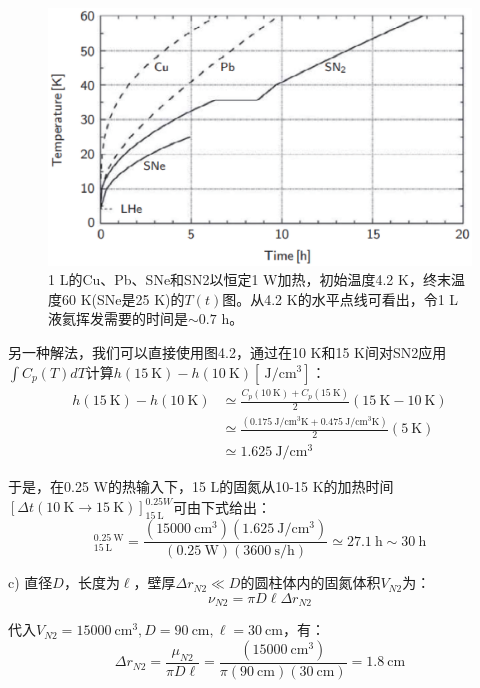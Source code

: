 \begin{figure}[htbp]
	\centering
	\includegraphics[scale=0.6]{chpt4/figs/fig4.18.eps}
	\caption{1 L的Cu、Pb、SNe和SN2以恒定1 W加热，初始温度4.2 K，终末温度60 K(SNe是25 K)的$T(t)$图。从4.2 K的水平点线可看出，令1 L液氦挥发需要的时间是$\sim 0.7$ h。}
\end{figure}

另一种解法，我们可以直接使用图4.2，通过在10 K和15 K间对SN2应用$\int C_p(T)dT$计算$h(15\ \mathrm{K})−h(10\ \mathrm{K}) [\ \mathrm{J/cm^3}]$：
\begin{align*}%
h(15\ \mathrm{K})-h(10\ \mathrm{K})&\simeq\frac{C_p(10\ \mathrm{K})+C_p(15\ \mathrm{K})}{2}(15\ \mathrm{K}-10\ \mathrm{K})\\
&\simeq\frac{(0.175\ \mathrm{J/cm^3K}+0.475\ \mathrm{J/cm^3K} )}{2}(5\ \mathrm{K})\\
&\simeq 1.625\ \mathrm{J/cm^3}
\end{align*}

于是，在0.25 W的热输入下，15 L的固氮从10-15 K的加热时间$[\Delta t(10\ \mathrm{K}\rightarrow 15\ \mathrm{K})]_{15\ \mathrm{L}}^{0.25 W}$可由下式给出： 
\begin{equation*}%
[\Delta(10\ \mathrm{K} \rightarrow 15\ \mathrm{K})]_{15\ \mathrm{L}}^{0.25\ \mathrm{W}}=\frac{(15000\ \mathrm{cm^3})(1.625\ \mathrm{J/cm^3})}{(0.25\ \mathrm{W})(3600\ \mathrm{s/h})}\simeq 27.1\ \mathrm{h}\sim 30\ \mathrm{h}
\end{equation*}

c) 直径$D$，长度为$\ell$，壁厚$\Delta r_{N2}\ll D$的圆柱体内的固氮体积$V_{N2}$为：
\begin{equation*}%
\nu_{N2}=\pi D\ell\Delta r_{N2} \tag{S3.1}
\end{equation*}

代入$V_{N2}=15000\ \mathrm{cm^3},D=90\ \mathrm{cm},\ell= 30\ \mathrm{cm}$，有：
\begin{equation*}%
\Delta r_{N2}=\frac{\mu_{N2}}{\pi D\ell}=\frac{(15000\ \mathrm{cm^3})}{\pi(90\ \mathrm{cm})(30\ \mathrm{cm})}=1.8\ \mathrm{cm}
\end{equation*}

